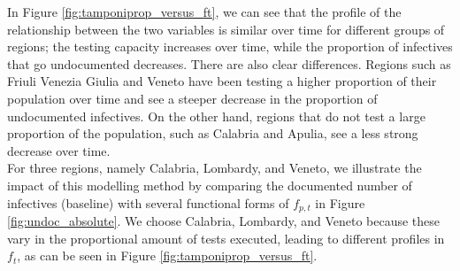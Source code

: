\documentclass[12pt]{article}
\begin{document}
	In Figure \ref{fig:tamponiprop_versus_ft}, we can see that the profile of the relationship between the two variables is similar over time for different groups of regions; the testing capacity increases over time, while the proportion of infectives that go undocumented decreases. There are also clear differences. Regions such as Friuli Venezia Giulia and Veneto have been testing a higher proportion of their population over time and see a steeper decrease in the proportion of undocumented infectives. On the other hand, regions that do not test a large proportion of the population, such as Calabria and Apulia, see a less strong decrease over time. \\
	
	For three regions, namely Calabria, Lombardy, and Veneto, we illustrate the impact of this modelling method by comparing the documented number of infectives (baseline) with several functional forms of $f_{p,t}$ in Figure \ref{fig:undoc_absolute}. We choose Calabria, Lombardy, and Veneto because these vary in the proportional amount of tests executed, leading to different profiles in $f_t$, as can be seen in Figure \ref{fig:tamponiprop_versus_ft}.
	
\end{document}
